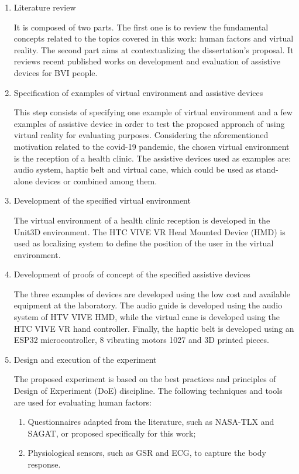 \begin{enumerate}[leftmargin = 6em, label = Step \arabic* -- ]
    \item Literature review 
    
    It is composed of two parts. The first one is to review the fundamental concepts related to the topics covered in this work: human factors and virtual reality. The second part aims at contextualizing the dissertation’s proposal. It reviews recent published works on development and evaluation of assistive devices for BVI people.
    
    \item Specification of examples of virtual environment and assistive devices

    This step consists of specifying one example of virtual environment and a few examples of assistive device in order to test the proposed approach of using virtual reality for evaluating purposes. Considering the aforementioned motivation related to the covid-19 pandemic, the chosen virtual environment is the reception of a health clinic. The assistive devices used as examples are: audio system, haptic belt and virtual cane, which could be used as stand-alone devices or combined among them.
    
    \item Development of the specified virtual environment
    
    The virtual environment of a health clinic reception is developed in the Unit3D environment. The HTC VIVE VR Head Mounted Device (HMD) is used as localizing system to define the position of the user in the virtual environment.
    
    \item Development of proofs of concept of the specified assistive devices
    
    The three examples of devices are developed using the low cost and available equipment at the laboratory. The audio guide is developed using the audio system of HTV VIVE HMD, while the virtual cane is developed using the HTC VIVE VR hand controller. Finally, the haptic belt is developed using an ESP32 microcontroller, 8 vibrating motors 1027 and 3D printed pieces.
    
    \item Design and execution of the experiment
    
    The proposed experiment is based on the best practices and principles of Design of Experiment (DoE) discipline.
    The following techniques and tools are used for evaluating human factors:
    \begin{enumerate}[label = \alph*)]
        \item Questionnaires adapted from the literature, such as NASA-TLX and SAGAT, or proposed specifically for this work;
        \item Physiological sensors, such as GSR and ECG, to capture the body response.
    \end{enumerate}
    

\end{enumerate}
